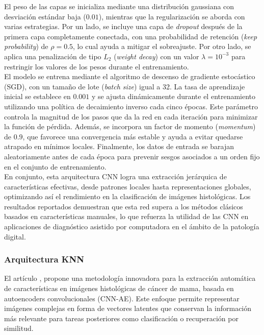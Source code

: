 \documentclass[12pt]{article} %
\begin{document}
El peso de las capas se inicializa mediante una distribución gaussiana con desviación estándar baja ($0.01$), mientras que la regularización se aborda con varias estrategias. Por un lado, se incluye una capa de \textit{dropout} después de la primera capa completamente conectada, con una probabilidad de retención (\textit{keep probability}) de $\rho = 0.5$, lo cual ayuda a mitigar el sobreajuste. Por otro lado, se aplica una penalización de tipo $L_2$ (\textit{weight decay}) con un valor $\lambda = 10^{-3}$ para restringir los valores de los pesos durante el entrenamiento.\\

El modelo se entrena mediante el algoritmo de descenso de gradiente estocástico (SGD), con un tamaño de lote (\textit{batch size}) igual a 32. La tasa de aprendizaje inicial se establece en $0.001$ y se ajusta dinámicamente durante el entrenamiento utilizando una política de decaimiento inverso cada cinco épocas. Este parámetro controla la magnitud de los pasos que da la red en cada iteración para minimizar la función de pérdida. Además, se incorpora un factor de momento (\textit{momentum}) de $0.9$, que favorece una convergencia más estable y ayuda a evitar quedarse atrapado en mínimos locales. Finalmente, los datos de entrada se barajan aleatoriamente antes de cada época para prevenir sesgos asociados a un orden fijo en el conjunto de entrenamiento.\\

En conjunto, esta arquitectura CNN logra una extracción jerárquica de características efectivas, desde patrones locales hasta representaciones globales, optimizando así el rendimiento en la clasificación de imágenes histológicas. Los resultados reportados demuestran que esta red supera a los métodos clásicos basados en características manuales, lo que refuerza la utilidad de las CNN en aplicaciones de diagnóstico asistido por computadora en el ámbito de la patología digital.\\

\subsubsection{Arquitectura KNN}
El artículo \cite{minarno2021cnn}, propone una metodología innovadora para la extracción automática de características en imágenes histológicas de cáncer de mama, basada en autoencoders convolucionales (CNN-AE). Este enfoque permite representar imágenes complejas en forma de vectores latentes que conservan la información más relevante para tareas posteriores como clasificación o recuperación por similitud. \\
\end{document}
